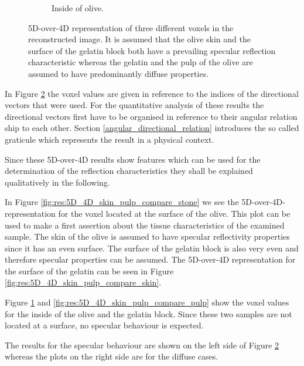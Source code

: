 \begin{figure}[H]
\begin{subfigure}[b]{0.47\textwidth}
         \caption{Inside of olive. }
         \label{fig:res:5D_4D_skin_pulp_compare_insideOlive}
     \end{subfigure}
        \caption{ 5D-over-4D representation of three different voxels in the reconstructed image. It is assumed that the olive skin and the surface of the gelatin block both have a prevailing specular reflection characteristic whereas the gelatin and the pulp of the olive are assumed to have predominantly diffuse properties. }
        \label{fig:res:5D_4D_skin_pulp_compare}
\end{figure}


 
In Figure \ref{fig:res:5D_4D_skin_pulp_compare} the voxel values are given in reference to the indices of the directional vectors that were used. For the quantitative analysis of these results the directional vectors first have to be organised in reference to their angular relation ship to each other. Section \ref{angular_directional_relation} introduces the so called graticule which represents the result in a physical context.

Since these 5D-over-4D results show features which can be used for the determination of the reflection characteristics they shall be explained qualitatively in the following.  


\medskip



In Figure \ref{fig:res:5D_4D_skin_pulp_compare_stone} we see the 5D-over-4D-representation for the voxel located at the surface of the olive. This plot can be used to make a first assertion about the tissue characteristics of the examined sample. The skin of the olive is assumed to have specular reflectivity properties since it has an even surface. The surface of the gelatin block is also very even and therefore specular properties can be assumed. The 5D-over-4D representation for the surface of the gelatin can be seen in Figure \ref{fig:res:5D_4D_skin_pulp_compare_skin}.

Figure \ref{fig:res:5D_4D_skin_pulp_compare_insideOlive} and \ref{fig:res:5D_4D_skin_pulp_compare_pulp} show the voxel values for the inside of the olive and the gelatin block. Since these two samples are not located at a surface, no specular behaviour is expected. 

The results for the specular behaviour are shown on the left side of Figure \ref{fig:res:5D_4D_skin_pulp_compare} whereas the plots on the right side are for the diffuse cases.


